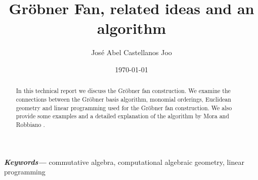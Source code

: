 \documentclass[a4paper, 11pt]{article}
\author{Jos\'e Abel Castellanos Joo}
\date{\today}
\title{Gr\"obner Fan, related ideas and an algorithm}
\providecommand{\keywords}[1]
{
  \small	
  \textbf{\textit{Keywords---}} #1
}
\begin{document}
\maketitle

\begin{abstract}
  In this technical report we discuss the Gr\"obner fan
  construction. We examine the connections between the
  Gr\"obner basis algorithm, monomial orderings,
  Euclidean geometry and linear programming
  used for the Gr\"obner fan construction. We also provide
  some examples and a detailed explanation of the algorithm
  by Mora and Robbiano \cite{MORA1988183}.
\end{abstract}

\keywords{commutative algebra, computational algebraic geometry, linear programming}









\end{document}
